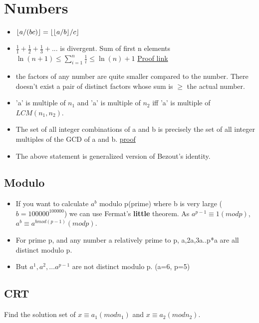 \documentclass[../Notes.tex]{subfiles}
\begin{document}
\chapter{Numbers}

\begin{itemize}
	\item $\floor*{a/(bc)} = \floor*{\floor*{a/b}/c}$
	\item $\frac{1}{1}+\frac{1}{2}+\frac{1}{3}+...$ is divergent.
	Sum of first n elements \\
	$\ln(n+1)\le\sum_{i=1}^n\frac1i\le\ln(n)+1$
	\href{./Material/divergent series proof.pdf}{Proof link}
	\item the factors of any number are quite smaller compared to the  number. There doesn't exist a pair of distinct factors whose sum is $\geq$ the actual number.
	\item 'a' is multiple of $n_1$ and 'a' is multiple of $n_2$ iff 'a' is multiple of $LCM(n_1,n_2)$. 
	\item The set of all integer combinations of a and b is precisely the set of all integer multiples of the GCD of a and b. \href{https://proofwiki.org/wiki/Set_of_Integer_Combinations_equals_Set_of_Multiples_of_GCD}{proof}
	\item The above statement is generalized version of Bezout's identity.
\end{itemize}

\section{Modulo}
\begin{itemize}
	\item If you want to calculate $a^b$ modulo p(prime) where b is very large ($b=100000^{100000}$) we can use Fermat's \textbf{little} theorem. As $a^{p-1}\equiv 1(mod p)$, $a^b\equiv a^{bmod(p-1)}(mod p)$.  
	\item For prime p, and any number a relatively prime to p, a,2a,3a..p*a are all distinct modulo p.
	\item But $a^1,a^2,\dotsc a^{p-1}$ are not distinct modulo p. (a=6, p=5)
\end{itemize}

\section{CRT}
Find the solution set of $x\equiv a_1(mod n_1)$ and $x\equiv a_2(mod n_2)$.\\
\end{document}
